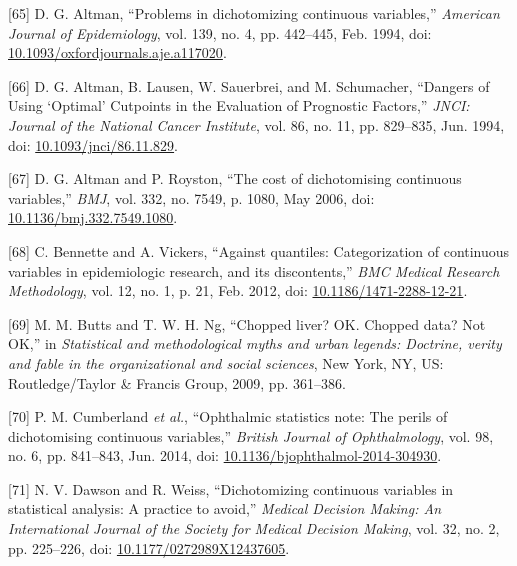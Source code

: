 \documentclass[12pt,PhD,twoside,openright]{muthesis}
\newenvironment{cslreferences}%
  {}%
  {\par}
\begin{document}
\begin{cslreferences}
\leavevmode\hypertarget{ref-altman_problems_1994-1}{}%
{[}65{]} D. G. Altman, ``Problems in dichotomizing continuous variables,'' \emph{American Journal of Epidemiology}, vol. 139, no. 4, pp. 442--445, Feb. 1994, doi: \href{https://doi.org/10.1093/oxfordjournals.aje.a117020}{10.1093/oxfordjournals.aje.a117020}.

\leavevmode\hypertarget{ref-altman_dangers_1994-1}{}%
{[}66{]} D. G. Altman, B. Lausen, W. Sauerbrei, and M. Schumacher, ``Dangers of Using `Optimal' Cutpoints in the Evaluation of Prognostic Factors,'' \emph{JNCI: Journal of the National Cancer Institute}, vol. 86, no. 11, pp. 829--835, Jun. 1994, doi: \href{https://doi.org/10.1093/jnci/86.11.829}{10.1093/jnci/86.11.829}.

\leavevmode\hypertarget{ref-altman_cost_2006-1}{}%
{[}67{]} D. G. Altman and P. Royston, ``The cost of dichotomising continuous variables,'' \emph{BMJ}, vol. 332, no. 7549, p. 1080, May 2006, doi: \href{https://doi.org/10.1136/bmj.332.7549.1080}{10.1136/bmj.332.7549.1080}.

\leavevmode\hypertarget{ref-bennette_against_2012-1}{}%
{[}68{]} C. Bennette and A. Vickers, ``Against quantiles: Categorization of continuous variables in epidemiologic research, and its discontents,'' \emph{BMC Medical Research Methodology}, vol. 12, no. 1, p. 21, Feb. 2012, doi: \href{https://doi.org/10.1186/1471-2288-12-21}{10.1186/1471-2288-12-21}.

\leavevmode\hypertarget{ref-butts_chopped_2009-1}{}%
{[}69{]} M. M. Butts and T. W. H. Ng, ``Chopped liver? OK. Chopped data? Not OK,'' in \emph{Statistical and methodological myths and urban legends: Doctrine, verity and fable in the organizational and social sciences}, New York, NY, US: Routledge/Taylor \& Francis Group, 2009, pp. 361--386.

\leavevmode\hypertarget{ref-cumberland_ophthalmic_2014-1}{}%
{[}70{]} P. M. Cumberland \emph{et al.}, ``Ophthalmic statistics note: The perils of dichotomising continuous variables,'' \emph{British Journal of Ophthalmology}, vol. 98, no. 6, pp. 841--843, Jun. 2014, doi: \href{https://doi.org/10.1136/bjophthalmol-2014-304930}{10.1136/bjophthalmol-2014-304930}.

\leavevmode\hypertarget{ref-dawson_dichotomizing_2012-1}{}%
{[}71{]} N. V. Dawson and R. Weiss, ``Dichotomizing continuous variables in statistical analysis: A practice to avoid,'' \emph{Medical Decision Making: An International Journal of the Society for Medical Decision Making}, vol. 32, no. 2, pp. 225--226, doi: \href{https://doi.org/10.1177/0272989X12437605}{10.1177/0272989X12437605}.


\end{cslreferences}
\end{document}
